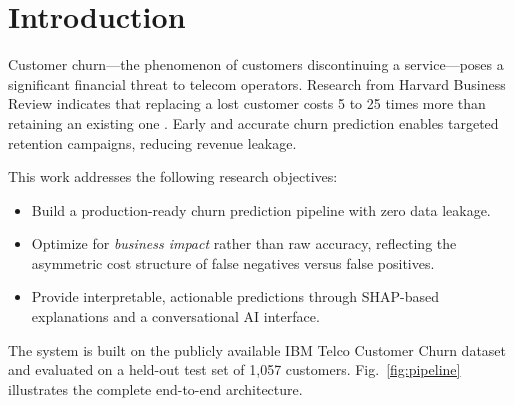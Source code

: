 \documentclass[conference]{IEEEtran}
\begin{document}
\section{Introduction}

Customer churn---the phenomenon of customers discontinuing a service---poses a significant financial threat to telecom operators. Research from Harvard Business Review indicates that replacing a lost customer costs 5 to 25 times more than retaining an existing one \cite{hbr2014}. Early and accurate churn prediction enables targeted retention campaigns, reducing revenue leakage.

This work addresses the following research objectives:
\begin{itemize}
    \item Build a production-ready churn prediction pipeline with zero data leakage.
    \item Optimize for \textit{business impact} rather than raw accuracy, reflecting the asymmetric cost structure of false negatives versus false positives.
    \item Provide interpretable, actionable predictions through SHAP-based explanations and a conversational AI interface.
\end{itemize}

The system is built on the publicly available IBM Telco Customer Churn dataset and evaluated on a held-out test set of 1,057 customers. Fig.~\ref{fig:pipeline} illustrates the complete end-to-end architecture.
\end{document}
